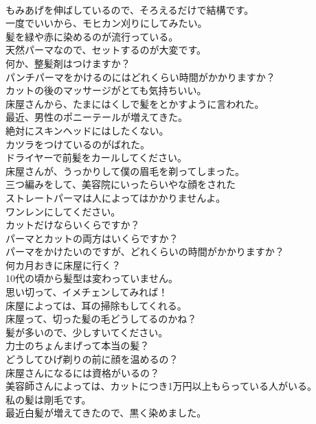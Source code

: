 \documentclass[8pt]{extreport}
\begin{document}
\begin{CJK}{UTF8}{min}
\\	もみあげを伸ばしているので、そろえるだけで結構です。	
\\	一度でいいから、モヒカン刈りにしてみたい。	
\\	髪を緑や赤に染めるのが流行っている。	
\\	天然パーマなので、セットするのが大変です。	
\\	何か、整髪剤はつけますか？	
\\	パンチパーマをかけるのにはどれくらい時間がかかりますか？	
\\	カットの後のマッサージがとても気持ちいい。	
\\	床屋さんから、たまにはくしで髪をとかすように言われた。	
\\	最近、男性のポニーテールが増えてきた。	
\\	絶対にスキンヘッドにはしたくない。	
\\	カツラをつけているのがばれた。	
\\	ドライヤーで前髪をカールしてください。	
\\	床屋さんが、うっかりして僕の眉毛を剃ってしまった。	
\\	三つ編みをして、美容院にいったらいやな顔をされた	
\\	ストレートパーマは人によってはかかりませんよ。	
\\	ワンレンにしてください。	
\\	カットだけならいくらですか？	
\\	パーマとカットの両方はいくらですか？	
\\	パーマをかけたいのですが、どれくらいの時間がかかりますか？	
\\	何カ月おきに床屋に行く？	
\\	10代の頃から髪型は変わっていません。	
\\	思い切って、イメチェンしてみれば！	
\\	床屋によっては、耳の掃除もしてくれる。	
\\	床屋って、切った髪の毛どうしてるのかね？	
\\	髪が多いので、少しすいてください。	
\\	力士のちょんまげって本当の髪？	
\\	どうしてひげ剃りの前に顔を温めるの？	
\\	床屋さんになるには資格がいるの？	
\\	美容師さんによっては、カットにつき1万円以上もらっている人がいる。	
\\	私の髪は剛毛です。	
\\	最近白髪が増えてきたので、黒く染めました。	

\end{CJK}
\end{document}
